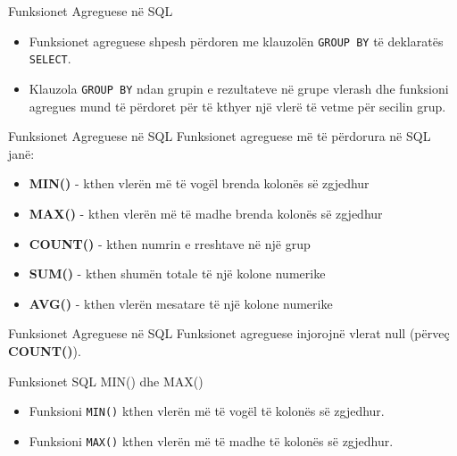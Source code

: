 \documentclass[
  ignorenonframetext,
]{beamer}
\providecommand{\tightlist}{%
  \setlength{\itemsep}{0pt}\setlength{\parskip}{0pt}}
\begin{document}
\begin{frame}[fragile]{Funksionet Agreguese në SQL}
\label{funksionet-agreguese-nuxeb-sql-1}
\begin{itemize}
\item
  Funksionet agreguese shpesh përdoren me klauzolën \texttt{GROUP\ BY}
  të deklaratës \texttt{SELECT}.
\item
  Klauzola \texttt{GROUP\ BY} ndan grupin e rezultateve në grupe vlerash
  dhe funksioni agregues mund të përdoret për të kthyer një vlerë të
  vetme për secilin grup.
\end{itemize}
\end{frame}

\begin{frame}{Funksionet Agreguese në SQL}
\label{funksionet-agreguese-nuxeb-sql-2}
Funksionet agreguese më të përdorura në SQL janë:

\begin{itemize}
\tightlist
\item
  \textbf{MIN()} - kthen vlerën më të vogël brenda kolonës së zgjedhur
\item
  \textbf{MAX()} - kthen vlerën më të madhe brenda kolonës së zgjedhur
\item
  \textbf{COUNT()} - kthen numrin e rreshtave në një grup
\item
  \textbf{SUM()} - kthen shumën totale të një kolone numerike
\item
  \textbf{AVG()} - kthen vlerën mesatare të një kolone numerike
\end{itemize}
\end{frame}

\begin{frame}{Funksionet Agreguese në SQL}
\label{funksionet-agreguese-nuxeb-sql-3}
Funksionet agreguese injorojnë vlerat null (përveç \textbf{COUNT()}).
\end{frame}

\begin{frame}[fragile]{Funksionet SQL MIN() dhe MAX()}
\label{funksionet-sql-min-dhe-max}
\begin{itemize}
\item
  Funksioni \texttt{MIN()} kthen vlerën më të vogël të kolonës së
  zgjedhur.
\item
  Funksioni \texttt{MAX()} kthen vlerën më të madhe të kolonës së
  zgjedhur.
\end{itemize}
\end{frame}
\end{document}
